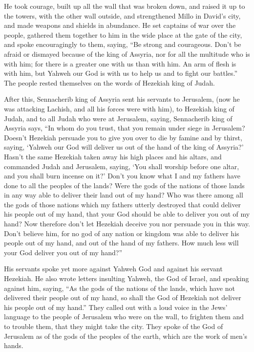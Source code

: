  He took courage, built up all the wall that was broken
down, and raised it up to the towers, with the other wall outside, and
strengthened Millo in David's city, and made weapons and shields in
abundance.  He set captains of war over the people, gathered
them together to him in the wide place at the gate of the city, and
spoke encouragingly to them, saying,  ``Be strong and
courageous. Don't be afraid or dismayed because of the king of Assyria,
nor for all the multitude who is with him; for there is a greater one
with us than with him.  An arm of flesh is with him, but
Yahweh our God is with us to help us and to fight our battles.'' The
people rested themselves on the words of Hezekiah king of Judah.

 After this, Sennacherib king of Assyria sent his servants
to Jerusalem, (now he was attacking Lachish, and all his forces were
with him), to Hezekiah king of Judah, and to all Judah who were at
Jerusalem, saying,  Sennacherib king of Assyria says, ``In
whom do you trust, that you remain under siege in Jerusalem?
 Doesn't Hezekiah persuade you to give you over to die by
famine and by thirst, saying, `Yahweh our God will deliver us out of the
hand of the king of Assyria?'  Hasn't the same Hezekiah
taken away his high places and his altars, and commanded Judah and
Jerusalem, saying, `You shall worship before one altar, and you shall
burn incense on it?'  Don't you know what I and my fathers
have done to all the peoples of the lands? Were the gods of the nations
of those lands in any way able to deliver their land out of my hand?
 Who was there among all the gods of those nations which my
fathers utterly destroyed that could deliver his people out of my hand,
that your God should be able to deliver you out of my hand?
 Now therefore don't let Hezekiah deceive you nor persuade
you in this way. Don't believe him, for no god of any nation or kingdom
was able to deliver his people out of my hand, and out of the hand of my
fathers. How much less will your God deliver you out of my hand?''

 His servants spoke yet more against Yahweh God and against
his servant Hezekiah.  He also wrote letters insulting
Yahweh, the God of Israel, and speaking against him, saying, ``As the
gods of the nations of the lands, which have not delivered their people
out of my hand, so shall the God of Hezekiah not deliver his people out
of my hand.''  They called out with a loud voice in the
Jews' language to the people of Jerusalem who were on the wall, to
frighten them and to trouble them, that they might take the city.
 They spoke of the God of Jerusalem as of the gods of the
peoples of the earth, which are the work of men's hands.

